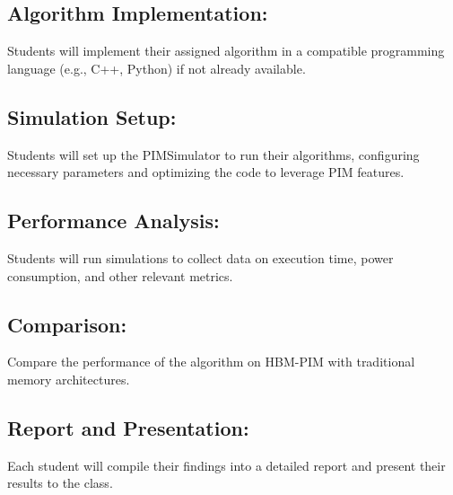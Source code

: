 \documentclass[12pt]{article}
\begin{document}
\subsection{Algorithm Implementation:}
Students will implement their assigned algorithm in a compatible programming language (e.g., C++, Python) if not already available.

\subsection{Simulation Setup:}
Students will set up the PIMSimulator to run their algorithms, configuring necessary parameters and optimizing the code to leverage PIM features.

\subsection{Performance Analysis:}
Students will run simulations to collect data on execution time, power consumption, and other relevant metrics.

\subsection{Comparison:}
Compare the performance of the algorithm on HBM-PIM with traditional memory architectures.

\subsection{Report and Presentation:}
Each student will compile their findings into a detailed report and present their results to the class.
\end{document}

